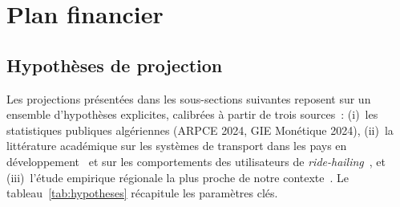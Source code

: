 \documentclass[12pt, a4paper, oneside]{report}
\begin{document}
\section{Plan financier}

\subsection{Hypothèses de projection}
\label{sec:hypotheses}

Les projections présentées dans les sous-sections suivantes reposent sur un ensemble d'hypothèses explicites, calibrées à partir de trois sources~: (i)~les statistiques publiques algériennes (ARPCE 2024, GIE Monétique 2024), (ii)~la littérature académique sur les systèmes de transport dans les pays en développement~\cite{sogbe_public_transport_2024} et sur les comportements des utilisateurs de \textit{ride-hailing}~\cite{amri_ride_hailing_2024}, et (iii)~l'étude empirique régionale la plus proche de notre contexte~\cite{naim_yassir_2024}. Le tableau~\ref{tab:hypotheses} récapitule les paramètres clés.
\end{document}
